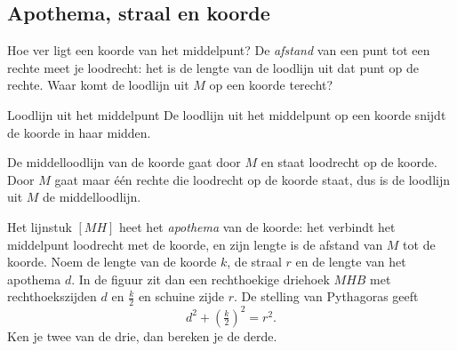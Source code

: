 \begin{oefeningen}
\end{oefeningen}

\subsection{Apothema, straal en koorde}

Hoe ver ligt een koorde van het middelpunt? De \emph{afstand} van een punt tot een rechte meet je loodrecht: het is de lengte van de loodlijn uit dat punt op de rechte. Waar komt de loodlijn uit $M$ op een koorde terecht?

\begin{theorie}
\begin{minipage}[t]{.64\linewidth}
\vspace{0pt}
\begin{stelling}{Loodlijn uit het middelpunt}
De loodlijn uit het middelpunt op een koorde snijdt de koorde in haar midden.
\end{stelling}

\begin{bewijs}
De middelloodlijn van de koorde gaat door $M$ en staat loodrecht op de koorde. Door $M$ gaat maar één rechte die loodrecht op de koorde staat, dus is de loodlijn uit $M$ de middelloodlijn.
\end{bewijs}
\end{minipage}\hfill
\begin{minipage}[t]{.32\linewidth}
\vspace{0pt}
\centering
{}
\end{minipage}
\end{theorie}

Het lijnstuk $[MH]$ heet het \emph{apothema} van de koorde: het verbindt het middelpunt loodrecht met de koorde, en zijn lengte is de afstand van $M$ tot de koorde. Noem de lengte van de koorde $k$, de straal $r$ en de lengte van het apothema $d$. In de figuur zit dan een rechthoekige driehoek $MHB$ met rechthoekszijden $d$ en $\tfrac{k}{2}$ en schuine zijde $r$. De stelling van Pythagoras geeft
\[ d^2 + \left(\tfrac{k}{2}\right)^2 = r^2. \]
Ken je twee van de drie, dan bereken je de derde.

